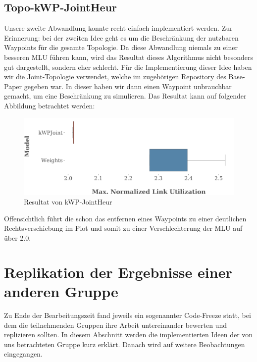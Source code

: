 \subsection{Topo-kWP-JointHeur}
Unsere zweite Abwandlung konnte recht einfach implementiert werden. Zur Erinnerung: bei der zweiten Idee geht es um die Beschränkung der nutzbaren Waypoints für die gesamte Topologie. Da diese Abwandlung niemals zu einer besseren MLU führen kann, wird das Resultat dieses Algorithmus nicht besonders gut dargestellt, sondern eher schlecht.
Für die Implementierung dieser Idee haben wir die Joint-Topologie verwendet, welche im zugehörigen Repository des Base-Paper gegeben war. In dieser haben wir dann einen Waypoint unbrauchbar gemacht, um eine Beschränkung zu simulieren. Das Resultat kann auf folgender Abbildung betrachtet werden:

\begin{figure}[h]
  \centering
  \includegraphics[width=\linewidth]{abbildungen/22}
  \caption{Resultat von kWP-JointHeur}
\end{figure}
Offensichtlich führt die schon das entfernen eines Waypoints zu einer deutlichen Rechtsverschiebung im Plot und somit zu einer Verschlechterung der MLU auf über 2.0.





\section{Replikation der Ergebnisse einer anderen Gruppe}
Zu Ende der Bearbeitungszeit fand jeweils ein sogenannter Code-Freeze statt, bei dem die teilnehmenden 
Gruppen ihre Arbeit untereinander bewerten und replizieren sollten. In diesem Abschnitt werden die implementierten Ideen
der von uns betrachteten Gruppe kurz erklärt. Danach wird auf weitere Beobachtungen eingegangen.
